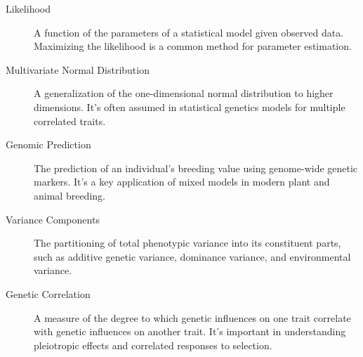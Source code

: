 \documentclass[12pt,a4paper]{article}
\begin{document}
\begin{description}
\item[Likelihood] A function of the parameters of a statistical model given observed data. Maximizing the likelihood is a common method for parameter estimation.

\item[Multivariate Normal Distribution] A generalization of the one-dimensional normal distribution to higher dimensions. It's often assumed in statistical genetics models for multiple correlated traits.

\item[Genomic Prediction] The prediction of an individual's breeding value using genome-wide genetic markers. It's a key application of mixed models in modern plant and animal breeding.

\item[Variance Components] The partitioning of total phenotypic variance into its constituent parts, such as additive genetic variance, dominance variance, and environmental variance.

\item[Genetic Correlation] A measure of the degree to which genetic influences on one trait correlate with genetic influences on another trait. It's important in understanding pleiotropic effects and correlated responses to selection.

\end{description}
\end{document}
